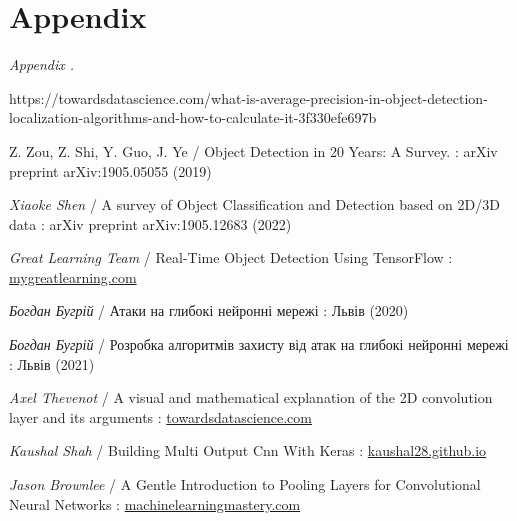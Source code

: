 \documentclass[14pt,a4paper]{extarticle}
\newcounter{e}
\newcounter{dod}
\newcommand{\dod}[1]{\refstepcounter{dod} \textit{Appendix \arabic{dod}\label{#1}.}}
\numberwithin{equation}{section}
\numberwithin{figure}{section}
\begin{document}
\newpage
\thispagestyle{empty}
\section*{Appendix}
\dod{dod-1}
\begin{center}
    
\end{center}
 
\newpage
\thispagestyle{empty}
\begin{thebibliography}{99}

    https://towardsdatascience.com/what-is-average-precision-in-object-detection-localization-algorithms-and-how-to-calculate-it-3f330efe697b


    Z. Zou, Z. Shi, Y. Guo, J. Ye /
    Object Detection in 20 Years: A Survey. :
    arXiv preprint arXiv:1905.05055 (2019)

    \textit{Xiaoke Shen} /
    A survey of Object Classification and Detection based on 2D/3D data :
    arXiv preprint arXiv:1905.12683 (2022)

    \textit{Great Learning Team} /
    Real-Time Object Detection Using TensorFlow :
    \href{https://www.mygreatlearning.com/blog/object-detection-using-tensorflow/}{mygreatlearning.com}

    \textit{Богдан Бугрій} /
    Атаки на глибокі нейронні мережі :
    Львів (2020)

    \textit{Богдан Бугрій} /
    Розробка алгоритмів захисту від атак на глибокі нейронні мережі :
    Львів (2021)

    \textit{Axel Thevenot} /
    A visual and mathematical explanation of the 2D convolution layer and its arguments :
    \href{https://towardsdatascience.com/conv2d-to-finally-understand-what-happens-in-the-forward-pass-1bbaafb0b148}{towardsdatascience.com}

    \textit{Kaushal Shah} /
    Building Multi Output Cnn With Keras :
    \href{https://kaushal28.github.io/Building-Multi-Output-CNN-with-Keras}{kaushal28.github.io}

    \textit{Jason Brownlee} /
    A Gentle Introduction to Pooling Layers for Convolutional Neural Networks :
    \href{https://machinelearningmastery.com/pooling-layers-for-convolutional-neural-networks}{machinelearningmastery.com}
 


\end{thebibliography}
\end{document}
